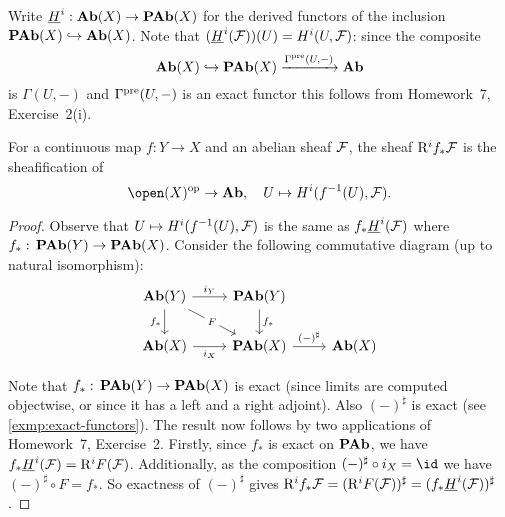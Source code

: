 \documentclass[../main.tex]{subfiles}
\begin{document}
\begin{defn}
    Write $\underline{H}^i\colon \catAbelianGroup(X) \to \catAbelianPresheaf(X)$ for the derived functors of the inclusion $\operatorname{\mathbf{PAb}}(X) \hookrightarrow \mathbf{Ab}(X)$. Note that $(\underline{H}^i(\mathcal{F}))(U) = H^i(U, \mathcal{F})$: since the composite
    \[\mathbf{Ab}(X) \hookrightarrow \operatorname{\mathbf{PAb}}(X) \xrightarrow{\Gamma^{\smash{\textup{pre}}}(U, -)} \mathbf{Ab}\] is $\Gamma(U, -)$ and $\Gamma^{\smash{\textup{pre}}}(U, -)$ is an exact functor this follows from Homework~7, Exercise~2(i).
\end{defn}

\begin{lem}
    For a continuous map $f\colon Y \to X$ and an abelian sheaf $\mathcal{F}$, the sheaf $\mathrm{R}^i f_* \mathcal{F}$ is the sheafification of \[\open(X)\opp \to \catAbelianGroup,\quad U \mapsto H^i(f^{-1}(U), \sh F).\]
\end{lem}
\begin{proof}
    Observe that $U\mapsto H^i(f^{-1}(U), \mathcal{F})$ is the same as $f_* \underline{H}^i(\mathcal{F})$ where $f_* \colon \catAbelianPresheaf(Y) \to \catAbelianPresheaf(X)$. Consider the following commutative diagram (up to natural isomorphism):
\[\begin{tikzcd}
	{\catAbelianGroup(Y)} & {\catAbelianPresheaf(Y)} \\
	{\catAbelianGroup(X)} & {\catAbelianPresheaf(X)} & {\catAbelianGroup(X)}
	\arrow["{i_Y}", from=1-1, to=1-2]
	\arrow["{f_*}"', from=1-1, to=2-1]
	\arrow["F"{description}, from=1-1, to=2-2]
	\arrow["{f_*}", from=1-2, to=2-2]
	\arrow["{i_X}"', from=2-1, to=2-2]
	\arrow["{(-)^\sharp}", from=2-2, to=2-3]
\end{tikzcd}\]

    Note that $f_*\colon \catAbelianPresheaf(Y) \to \catAbelianPresheaf(X)$ is exact (since limits are computed objectwise, or since it has a left and a right adjoint). Also $(-)^\sharp$ is exact (see \cref{exmp:exact-functors}). The result now follows by two applications of Homework~7, Exercise~2. Firstly, since $f_*$ is exact on $\operatorname{\mathbf{PAb}}$, we have $f_* \underline{H}^i(\mathcal{F}) = \mathrm{R}^i F(\mathcal{F})$. Additionally, as the composition $(-)^\sharp \circ i_X = \id$ we have $(-)^\sharp \circ F = f_*$. So exactness of $(-)^\sharp$ gives $\mathrm{R}^i f_* \mathcal{F} = (\mathrm{R}^i F(\mathcal{F}))^\sharp = (f_* \underline{H}^i(\mathcal{F}))^\sharp$.
\end{proof}
\end{document}
